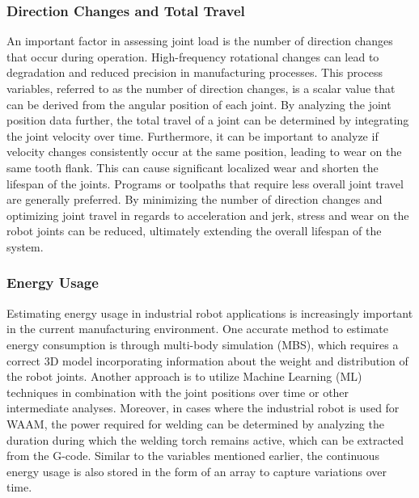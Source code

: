 \subsubsection*{Direction Changes and Total Travel}
An important factor in assessing joint load is the number of direction changes that occur during operation. High-frequency rotational changes can lead to degradation and reduced precision in manufacturing processes. This process variables, referred to as the number of direction changes, is a scalar value that can be derived from the angular position of each joint. By analyzing the joint position data further, the total travel of a joint can be determined by integrating the joint velocity over time. Furthermore, it can be important to analyze if velocity changes consistently occur at the same position, leading to wear on the same tooth flank. This can cause significant localized wear and shorten the lifespan of the joints. Programs or toolpaths that require less overall joint travel are generally preferred. By minimizing the number of direction changes and optimizing joint travel in regards to acceleration and jerk, stress and wear on the robot joints can be reduced, ultimately extending the overall lifespan of the system.



\subsubsection*{Energy Usage}
Estimating energy usage in industrial robot applications is increasingly important in the current manufacturing environment. One accurate method to estimate energy consumption is through multi-body simulation (\acrshort{MBS}), which requires a correct 3D model incorporating information about the weight and distribution of the robot joints. Another approach is to utilize Machine Learning (\acrshort{ML}) techniques in combination with the joint positions over time or other intermediate analyses. Moreover, in cases where the industrial robot is used for \acrshort{WAAM}, the power required for welding can be determined by analyzing the duration during which the welding torch remains active, which can be extracted from the G-code. Similar to the variables mentioned earlier, the continuous energy usage is also stored in the form of an array to capture variations over time.

